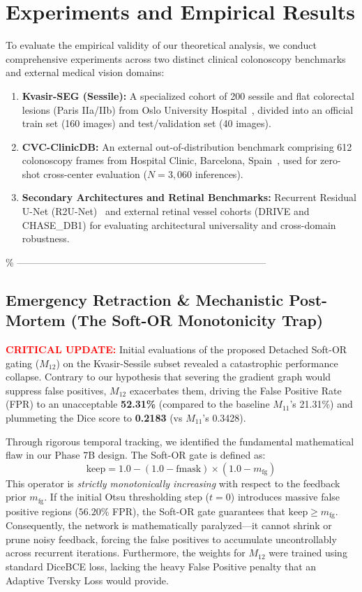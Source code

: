 \section{Experiments and Empirical Results}
\label{sec:experiments}

To evaluate the empirical validity of our theoretical analysis, we
conduct comprehensive experiments across two distinct clinical
colonoscopy benchmarks and external medical vision domains:
\begin{enumerate}
  \item \textbf{Kvasir-SEG (Sessile):} A specialized cohort of 200
        sessile and flat colorectal lesions (Paris IIa/IIb) from Oslo
        University Hospital~\cite{jha2020kvasir}, divided into an
        official train set (160 images) and test/validation set
        (40 images).
  \item \textbf{CVC-ClinicDB:} An external out-of-distribution
        benchmark comprising 612 colonoscopy frames from Hospital
        Clinic, Barcelona, Spain~\cite{bernal2017comparative}, used
        for zero-shot cross-center evaluation ($N = 3{,}060$ inferences).
  \item \textbf{Secondary Architectures and Retinal Benchmarks:}
        Recurrent Residual U-Net (R2U-Net)~\cite{alom2018recurrent} and
        external retinal vessel cohorts (DRIVE and CHASE\_DB1) for
        evaluating architectural universality and cross-domain robustness.
\end{enumerate}

\% -----------------------------------------------------------------------------

\subsection*{Emergency Retraction & Mechanistic Post-Mortem (The Soft-OR Monotonicity Trap)}
\textcolor{red}{\textbf{CRITICAL UPDATE:}} Initial evaluations of the proposed Detached Soft-OR gating ($M_{12}$) on the Kvasir-Sessile subset revealed a catastrophic performance collapse. Contrary to our hypothesis that severing the gradient graph would suppress false positives, $M_{12}$ exacerbates them, driving the False Positive Rate (FPR) to an unacceptable \textbf{52.31\%} (compared to the baseline $M_{11}$'s 21.31\%) and plummeting the Dice score to \textbf{0.2183} (vs $M_{11}$'s 0.3428).

Through rigorous temporal tracking, we identified the fundamental mathematical flaw in our Phase 7B design. The Soft-OR gate is defined as:
\[ \text{keep} = 1.0 - (1.0 - \text{fmask}) \times (1.0 - m_{\text{fg}}) \]
This operator is \textit{strictly monotonically increasing} with respect to the feedback prior $m_{\text{fg}}$. If the initial Otsu thresholding step ($t=0$) introduces massive false positive regions ($56.20\%$ FPR), the Soft-OR gate guarantees that $\text{keep} \ge m_{\text{fg}}$. Consequently, the network is mathematically paralyzed---it cannot shrink or prune noisy feedback, forcing the false positives to accumulate uncontrollably across recurrent iterations. Furthermore, the weights for $M_{12}$ were trained using standard DiceBCE loss, lacking the heavy False Positive penalty that an Adaptive Tversky Loss would provide.

